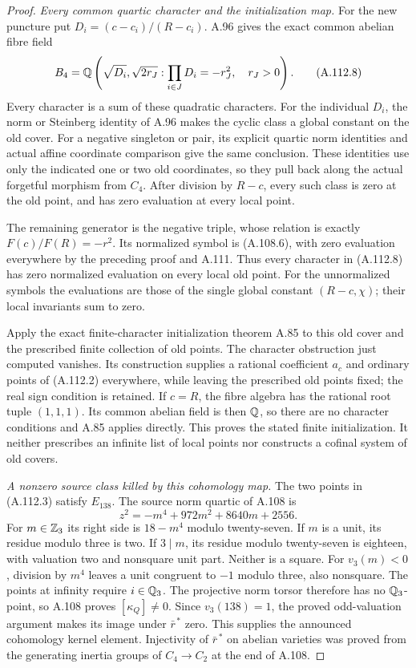\begin{proof}
\emph{Every common quartic character and the initialization map.}
For the new puncture put $D_i=(c-c_i)/(R-c_i)$.
A.96 gives the exact common abelian fibre field
\[
 B_4=\mathbb Q\left(\sqrt{D_i},
       \sqrt{2r_J}:
       \prod_{i\in J}D_i=-r_J^2,\quad r_J>0\right).
\tag{A.112.8}
\]
Every character is a sum of these quadratic
characters.
For the individual $D_i$, the norm or Steinberg
identity of A.96 makes the cyclic class a global
constant on the old cover.
For a negative singleton or pair, its explicit
quartic norm identities and actual affine coordinate
comparison give the same conclusion.
These identities use only the indicated one or two
old coordinates, so they pull back along the
actual forgetful morphism from $C_4$.
After division by $R-c$, every such class is
zero at the old point, and has zero evaluation
at every local point.

The remaining generator is the negative triple,
whose relation is exactly $F(c)/F(R)=-r^2$.
Its normalized symbol is (A.108.6), with zero
evaluation everywhere by the preceding proof
and A.111.
Thus every character in (A.112.8) has zero
normalized evaluation on every local old point.
For the unnormalized symbols the evaluations are
those of the single global constant $(R-c,\chi)$;
their local invariants sum to zero.

Apply the exact finite-character initialization
theorem A.85 to this old cover and the prescribed
finite collection of old points.
The character obstruction just computed vanishes.
Its construction supplies a rational coefficient
$a_c$ and ordinary points of (A.112.2) everywhere,
while leaving the prescribed old points fixed;
the real sign condition is retained.
If $c=R$, the fibre algebra has the rational root
tuple $(1,1,1)$.
Its common abelian field is then $\mathbb Q$, so there
are no character conditions and A.85 applies
directly.
This proves the stated finite initialization.
It neither prescribes an infinite list of local
points nor constructs a cofinal system of old
covers.

\emph{A nonzero source class killed by this cohomology map.}
The two points in (A.112.3) satisfy $E_{138}$.
The source norm quartic of A.108 is
\[
                 z^2=-m^4+972m^2+8640m+2556.
\tag{A.112.9}
\]
For $m\in\mathbb Z_3$ its right side is $18-m^4$ modulo
twenty-seven.
If $m$ is a unit, its residue modulo three is two.
If $3\mid m$, its residue modulo twenty-seven is
eighteen, with valuation two and nonsquare unit part.
Neither is a square.
For $v_3(m)<0$, division by $m^4$ leaves a unit
congruent to $-1$ modulo three, also nonsquare.
The points at infinity require $i\in\mathbb Q_3$.
The projective norm torsor therefore has no
$\mathbb Q_3$-point, so A.108 proves $[\kappa_Q]\ne0$.
Since $v_3(138)=1$, the proved odd-valuation
argument makes its image under $\bar r^{\,*}$ zero.
This supplies the announced cohomology kernel
element. Injectivity of $\bar r^{\,*}$ on abelian
varieties was proved from the generating inertia
groups of $C_4\to C_2$ at the end of A.108.
\end{proof}

